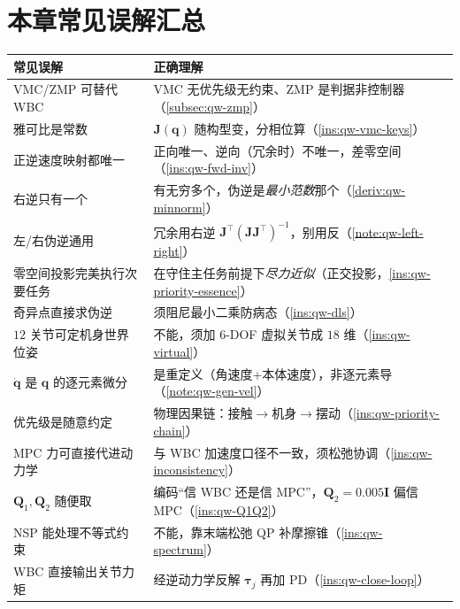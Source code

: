\section*{本章常见误解汇总}
\begin{table}[H]\centering\small
\begin{tabular}{p{} p{}}
\toprule
\textbf{常见误解} & \textbf{正确理解} \\
\midrule
VMC/ZMP 可替代 WBC & VMC 无优先级无约束、ZMP 是判据非控制器（\cref{subsec:qw-zmp}）\\
雅可比是常数 & $\boldsymbol{J}(\boldsymbol{q})$ 随构型变，分相位算（\cref{ins:qw-vmc-keys}）\\
正逆速度映射都唯一 & 正向唯一、逆向（冗余时）不唯一，差零空间（\cref{ins:qw-fwd-inv}）\\
右逆只有一个 & 有无穷多个，伪逆是\emph{最小范数}那个（\cref{deriv:qw-minnorm}）\\
左/右伪逆通用 & 冗余用右逆 $\boldsymbol{J}^\top(\boldsymbol{J}\boldsymbol{J}^\top)^{-1}$，别用反（\cref{note:qw-left-right}）\\
零空间投影完美执行次要任务 & 在守住主任务前提下\emph{尽力近似}（正交投影，\cref{ins:qw-priority-essence}）\\
奇异点直接求伪逆 & 须阻尼最小二乘防病态（\cref{ins:qw-dls}）\\
$12$ 关节可定机身世界位姿 & 不能，须加 $6$-DOF 虚拟关节成 $18$ 维（\cref{ins:qw-virtual}）\\
$\dot{\boldsymbol{q}}$ 是 $\boldsymbol{q}$ 的逐元素微分 & 是重定义（角速度+本体速度），非逐元素导（\cref{note:qw-gen-vel}）\\
优先级是随意约定 & 物理因果链：接触$\to$机身$\to$摆动（\cref{ins:qw-priority-chain}）\\
MPC 力可直接代进动力学 & 与 WBC 加速度口径不一致，须松弛协调（\cref{ins:qw-inconsistency}）\\
$\boldsymbol{Q}_1,\boldsymbol{Q}_2$ 随便取 & 编码“信 WBC 还是信 MPC”，$\boldsymbol{Q}_2{=}0.005\mathbf{I}$ 偏信 MPC（\cref{ins:qw-Q1Q2}）\\
NSP 能处理不等式约束 & 不能，靠末端松弛 QP 补摩擦锥（\cref{ins:qw-spectrum}）\\
WBC 直接输出关节力矩 & 经逆动力学反解 $\boldsymbol{\tau}_j$ 再加 PD（\cref{ins:qw-close-loop}）\\
\bottomrule
\end{tabular}
\end{table}

